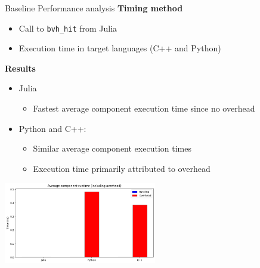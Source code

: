 \begin{frame}{Baseline Performance analysis}
        \textbf{Timing method}
        \begin{itemize}
            \item Call to \texttt{bvh\_hit} from Julia
            \item Execution time in target languages (C++ and Python)
        \end{itemize}
        \pause
        \textbf{Results}
        \begin{itemize}
            \item Julia
            \begin{itemize}
                \item Fastest average component execution time since no overhead
            \end{itemize}
            \item Python and C++:
            \begin{itemize}
                \item Similar average component execution times
                \item Execution time primarily attributed to overhead
            \end{itemize}
        \end{itemize}
    \begin{center}
        \includegraphics[width=0.5\textwidth]{assets/time-and-overhead.png} %
    \end{center}
\end{frame}